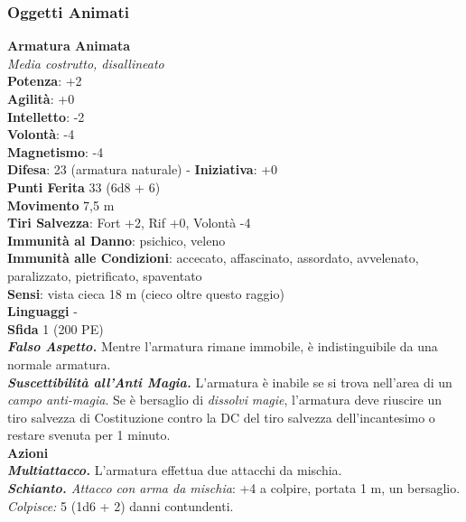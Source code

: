 \begin{multicols}{2}
\subsubsection{Oggetti Animati}

\medskip\textbf{Armatura Animata}\\
\emph{Media costrutto, disallineato}\\
\textbf{Potenza}: +2\\
\textbf{Agilità}: +0\\
\textbf{Intelletto}: -2\\
\textbf{Volontà}: -4\\
\textbf{Magnetismo}: -4\\
\textbf{Difesa}: 23 (armatura naturale) - \textbf{Iniziativa}: +0\\
\textbf{Punti Ferita} 33 (6d8 + 6)\\
\textbf{Movimento} 7,5 m\\
\textbf{Tiri Salvezza}: Fort +2, Rif +0, Volontà -4\\
\textbf{Immunità al Danno}: psichico, veleno\\
\textbf{Immunità alle Condizioni}: accecato, affascinato, assordato, avvelenato, paralizzato, pietrificato, spaventato \\
\textbf{Sensi}: vista cieca 18 m (cieco oltre questo raggio)\\
\textbf{Linguaggi} -\\
\textbf{Sfida} 1 (200 PE)\smallskip\\
\emph{\textbf{Falso Aspetto.}} Mentre l'armatura rimane immobile, è indistinguibile da una normale armatura.\\
\emph{\textbf{Suscettibilità all'Anti Magia.}} L'armatura è inabile se si trova nell'area di un \emph{campo anti-magia}. Se è bersaglio di \emph{dissolvi} \emph{magie}, l'armatura deve riuscire un tiro salvezza di Costituzione contro la DC del tiro salvezza dell'incantesimo o restare svenuta per 1 minuto.\\
\smallskip\textbf{Azioni}\\
\emph{\textbf{Multiattacco.}} L'armatura effettua due attacchi da mischia.\\
\emph{\textbf{Schianto.} Attacco con arma da mischia}: +4 a colpire, portata 1 m, un bersaglio.\\
\emph{Colpisce:} 5 (1d6 + 2) danni contundenti.\\


\end{multicols}
